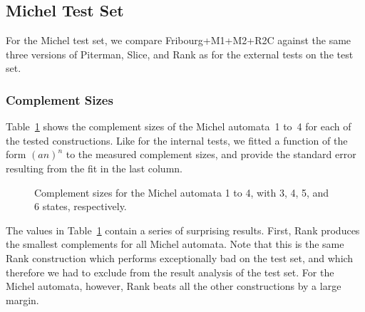 


\subsection{Michel Test Set}
\label{5_external_michel}
For the Michel test set, we compare Fribourg+M1+M2+R2C against the same three versions of Piterman, Slice, and Rank as for the external tests on the \goal{} test set. 

\subsubsection{Complement Sizes}
Table~\ref{e.m.states} shows the complement sizes of the Michel automata~1 to~4 for each of the tested constructions. Like for the internal tests, we fitted a function of the form $(an)^n$ to the measured complement sizes, and provide the standard error resulting from the fit in the last column.

\begin{figure}[htb]
\centering

\caption{Complement sizes for the Michel automata 1 to 4, with 3, 4, 5, and 6 states, respectively.}
\label{e.m.states}
\end{figure}

The values in Table~\ref{e.m.states} contain a series of surprising results. First, Rank produces the smallest complements for all Michel automata. Note that this is the same Rank construction which performs exceptionally bad on the \goal{} test set, and which therefore we had to exclude from the result analysis of the \goal{} test set. For the Michel automata, however, Rank beats all the other constructions by a large margin.

